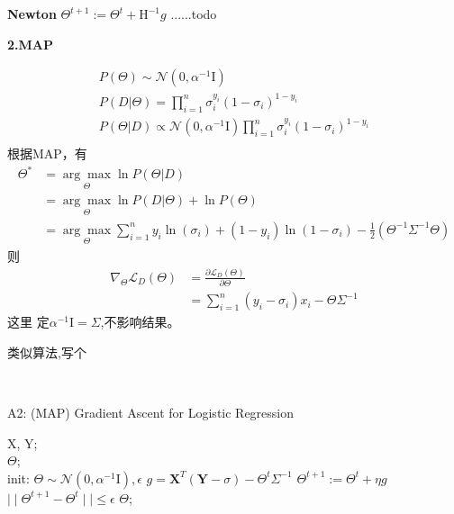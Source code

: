 \documentclass[UTF8]{ctexart}
\numberwithin{equation}{section}
\begin{document}
\textbf{Newton}
$\Theta^{t+1} := \Theta^t + \text{H}^{-1} g$
......todo

\textbf{2.MAP}

\begin{gather*}
    P(\Theta) \sim \mathcal{N}(0, \alpha^{-1}\text{I}) \\
    P(D|\Theta) = \prod_{i=1}^n\sigma_i^{y_i}(1-\sigma_i)^{1-y_i} \\
    P(\Theta | D) \propto \mathcal{N}(0, \alpha^{-1}\text{I}) \prod_{i=1}^n\sigma_i^{y_i}(1-\sigma_i)^{1-y_i} \\
\end{gather*}
根据MAP，有
\begin{equation*}
    \begin{aligned}
        \Theta^* &= \underset {\Theta} {\arg \max} \ln{P(\Theta|D)} \\
        &= \underset{\Theta}{\arg \max} \ln P(D|\Theta) + \ln P(\Theta) \\
        &= \underset{\Theta}{\arg \max} {\sum_{i=1}^n y_i \ln(\sigma_i) + (1-y_i)\ln{(1-\sigma_i)} -\frac{1}{2}(\Theta^{-1}\Sigma^{-1}\Theta)} 
    \end{aligned}        
\end{equation*}
则
\begin{equation*}
    \begin{aligned}
        \nabla_\Theta \mathcal{L}_D(\Theta) &=\frac{\partial \mathcal{L}_D ( \Theta) }{\partial \Theta} \\
        &= \sum_{i=1}^n(y_i-\sigma_i)x_i - \Theta \Sigma^{-1} 
    \end{aligned}
\end{equation*}
这里 定$\alpha^{-1}\mathrm{I} = \Sigma$,不影响结果。

类似算法,写个

\
\begin{algorithm}[htb]
    \caption{A2: (MAP) Gradient Ascent for Logistic Regression}
    \label{alg:A2}
    \begin{algorithmic}[1]
    \REQUIRE
    X, Y; \\
    \ENSURE 
    $\Theta$; \\
    \STATE init: $\Theta \sim \mathcal{N}(0, \alpha^{-1}\mathrm{I}), \epsilon$
    \REPEAT 
    \STATE $g=\mathbf{X}^T(\mathbf{Y}-\sigma) - \Theta^t\Sigma^{-1}$
    \STATE $\Theta^{t+1} := \Theta^t + \eta g$
    \UNTIL $\mid\mid \Theta^{t+1} -\Theta^t \mid\mid \leq \epsilon$
    \RETURN $\Theta$;
    \end{algorithmic}
\end{algorithm}
\end{document}
